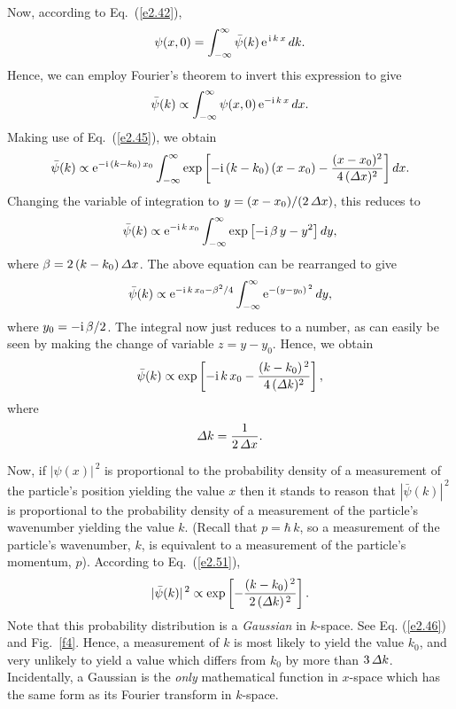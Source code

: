 Now, according to Eq.~(\ref{e2.42}), 
\begin{equation}
\psi(x,0) = \int_{-\infty}^{\infty} \bar{\psi}(k)\,{\rm e}^{\,{\rm i}\,k\,x}\,dk.
\end{equation}
Hence, we can employ Fourier's theorem to invert this expression to give
\begin{equation}\label{e2.42a}
\bar{\psi}(k)\propto \int_{-\infty}^{\infty} \psi(x,0)\,{\rm e}^{-{\rm i}\,k\,x}\,dx.
\end{equation}
Making use of Eq.~(\ref{e2.45}),
we obtain
\begin{equation}
\bar{\psi}(k) \propto
{\rm e}^{-{\rm i}\,(k-k_0)\,x_0}\int_{-\infty}^{\infty} \exp\left[
-{\rm i}\,(k-k_0)\,(x-x_0) - \frac{(x-x_0)^2}{4\,({\mit\Delta}x)^2}\right]dx.
\end{equation}
Changing the variable of integration to $y=(x-x_0)/ (2\,{\mit\Delta} x)$, this reduces to
\begin{equation}
\bar{\psi}(k) \propto {\rm e}^{-{\rm i}\,k\,x_0}
\int_{-\infty}^{\infty}\exp\left[-{\rm i}\,\beta\,y - y^2\right] dy,
\end{equation}
where $\beta = 2\,(k-k_0)\,{\mit\Delta}x$. The above equation
 can be rearranged to give
\begin{equation}
\bar{\psi}(k) \propto {\rm e}^{-{\rm i}\,k\,x_0 - \beta^2/4}\int_{-\infty}^{\infty} {\rm e}^{-(y-y_0)^{\,2}}\,dy,
\end{equation}
where $y_0 = - {\rm i}\,\beta/2$. The integral now just reduces to a number,
as can easily be seen by making the change of variable $z=y-y_0$. 
Hence, we obtain
\begin{equation}\label{e2.51}
\bar{\psi}(k) \propto \exp\left[-{\rm i}\,k\,x_0 - \frac{(k-k_0)^{\,2}}{4\,({\mit\Delta}k)^2}\right],
\end{equation}
where
\begin{equation}
{\mit\Delta} k = \frac{1}{2\,{\mit\Delta} x}.
\end{equation}

Now, if $|\psi(x)|^{\,2}$ is proportional to the probability density of a measurement of  the
particle's position yielding the value $x$ then it stands to reason that $|\bar{\psi}(k)|^{\,2}$
is proportional to the probability density of a measurement of the
particle's wavenumber yielding the value $k$. (Recall that $p = \hbar\,k$,
so a measurement of the particle's wavenumber, $k$, is equivalent to a measurement of the particle's
momentum, $p$). According to Eq.~(\ref{e2.51}),
\begin{equation}\label{e2.53}
|\bar{\psi}(k)|^{\,2} \propto \exp\left[- \frac{(k-k_0)^{\,2}}{2\,({\mit\Delta}k)^{\,2}}\right].
\end{equation}
Note that this probability distribution is a {\em Gaussian}\/ in $k$-space. See
Eq. (\ref{e2.46}) and Fig.~\ref{f4}. Hence, a measurement of $k$ is
most likely to yield the value $k_0$, and very unlikely to yield
a value which differs from $k_0$ by more than
$3\,{\mit\Delta}k$. Incidentally,  a Gaussian is the {\em only}\/ mathematical function
in $x$-space which has the same form as its Fourier transform in $k$-space.

